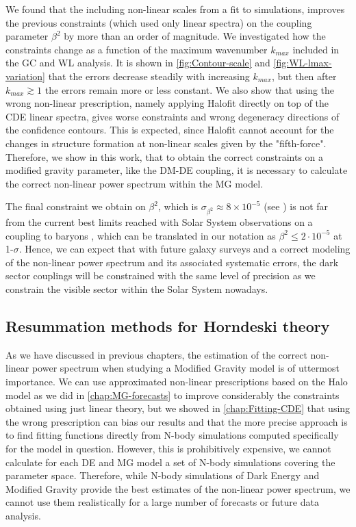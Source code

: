 We found that the including non-linear scales from a fit to simulations, improves the previous constraints (which used only linear spectra) on the coupling parameter $\beta^2$ 
by more than an order of magnitude. 
We investigated how the constraints change as a function of the maximum wavenumber $k_{max}$ included in the GC and WL analysis.
It is shown in \cref{fig:Contour-scale} and \cref{fig:WL-lmax-variation} that the errors decrease steadily with increasing $k_{max}$,
but then after $k_{max} \gtrsim 1$ the errors remain more or less constant.
We also show that using the wrong non-linear prescription, namely applying Halofit directly on top of the CDE linear spectra,
gives worse constraints and wrong degeneracy directions of the confidence contours. This is expected, since Halofit cannot account for the 
changes in structure formation at non-linear scales given by the "fifth-force".
Therefore, we show in this work, that to obtain the correct constraints on a modified gravity parameter, like the DM-DE coupling, 
it is necessary to calculate the correct non-linear power spectrum within the MG model.

The final constraint we obtain on $\beta^2$, which is $\sigma_{\beta^2} \approx 8\times 10^{-5}$ (see \cite{casas_fitting_2015})
is not far from the current
best limits reached with Solar System observations on a coupling to
baryons \cite{Agashe:2014kda}, which can be translated in our notation
as $\beta^{2}\le2\cdot10^{-5}$ at 1-$\sigma$.
Hence, we can expect that with future galaxy surveys and a correct modeling of the non-linear power spectrum and its associated
systematic errors, the dark sector couplings will be constrained with the same level of precision as we constrain the visible sector
within the Solar System nowadays.

\subsection*{Resummation methods for Horndeski theory}

As we have discussed in previous chapters, the estimation of the correct non-linear power spectrum when studying a Modified Gravity model
is of uttermost importance. We can use approximated non-linear prescriptions based on the Halo model as we did in \cref{chap:MG-forecasts}
to improve considerably the constraints obtained using just linear theory,
but we showed in \cref{chap:Fitting-CDE} that using the wrong prescription can bias our results and that the more precise approach is to 
find fitting functions directly from N-body simulations computed specifically for the model in question.
However, this is prohibitively expensive, we cannot calculate for each DE and MG model a set of N-body simulations covering
the parameter space. Therefore, while N-body simulations of Dark Energy and Modified Gravity provide 
the best estimates of the non-linear power spectrum, we cannot use them realistically for a large number of forecasts or future data analysis.

